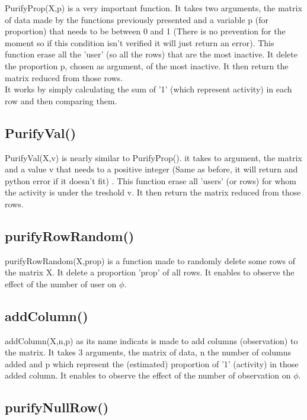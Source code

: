 \documentclass{report}
\begin{document}
PurifyProp(X,p) is a very important function. It takes two arguments, the matrix of data made by the functions previously presented and a variable p (for proportion) that needs to be between 0 and 1 (There is no prevention for the moment so if this condition isn't verified it will just return an error). This function erase all the 'user' (so all the rows) that are the most inactive. It delete the proportion p, chosen as argument, of the most inactive. It then return the matrix reduced from those rows.\\

It works by simply calculating the sum of '1' (which represent activity) in each row and then comparing them.

\subsection{PurifyVal()}

PurifyVal(X,v) is nearly similar to PurifyProp(). it takes to argument, the matrix and a value v that needs to a positive integer (Same as before, it will return and python error if it doesn't fit) . This function erase all 'users' (or rows) for whom the activity is under the treshold v. It then return the matrix reduced from those rows.\\

\subsection{purifyRowRandom()}

purifyRowRandom(X,prop) is a function made to randomly delete some rows of the matrix X. It delete a proportion 'prop' of all rows. It enables to observe the effect of the number of user on $\phi $.

\subsection{addColumn()}

addColumn(X,n,p) as its name indicats is made to add columns (observation) to the matrix. It takes 3 arguments, the matrix of data, n the number of columns added and p which represent the (estimated) proportion of '1' (activity) in those added column. It enables to observe the effect of the number of observation on $\phi $.

\subsection{purifyNullRow()}
\end{document}
